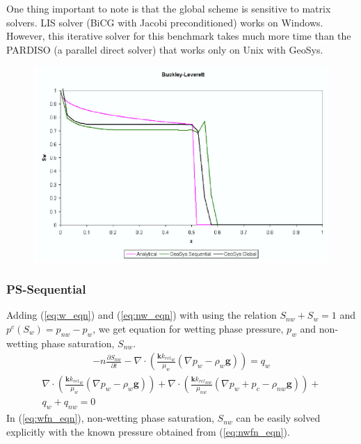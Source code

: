 One thing important to note is that the global scheme is sensitive to matrix solvers. LIS solver (BiCG with Jacobi preconditioned) works on Windows. However, this iterative solver for this benchmark takes much more time than the PARDISO (a parallel direct solver) that works only on Unix with GeoSys.
\begin{figure}[!thb]
\begin{center}
\includegraphics[scale=0.5]{HH/figures/PSGlobal.eps}
\end{center}
\vspace{-8.0cm}
\caption{}
\label{blg:comparison}
\end{figure}
\subsubsection*{\upshape\textbf{PS-Sequential}}
\hspace*{0.25cm}Adding (\ref{eq:w_eqn}) and (\ref{eq:nw_eqn}) with using the relation $S_{nw}+ S_w = 1$ and $p^{c}(S_w) = p_{nw} - p_w$, we get equation for wetting phase pressure, $p_{w}$ and non-wetting phase saturation, $S_{nw}$.
\begin{align}
 - n\frac{{\partial S_{nw}}}{{\partial t }} -
\nabla \cdot \left({\frac{{\mathbf k {k_{rel}}_w }}{{\mu_w }}\left( {\nabla p_w - \rho _w
\mathbf g} \right)} \right) = q_w
\label{eq:wfn_eqn}
\end{align}
\begin{align}
\nabla \cdot \left({\frac{{\mathbf k {k_{rel}}_w }}{{\mu_w }}\left( {\nabla p_w - \rho _w
\mathbf g} \right)} \right) +
\nabla \cdot \left({\frac{{\mathbf k {k_{rel}}_{nw} }}{{\mu_{nw} }}\left( {\nabla {p_w+p_c} - \rho _{nw}\mathbf g} \right)} \right) + \nonumber\\q_w + q_{nw} =0
\label{eq:nwfn_eqn}
\end{align}
In (\ref{eq:wfn_eqn}), non-wetting phase saturation, $S_{nw}$ can
be easily solved explicitly with the known pressure obtained from
(\ref{eq:nwfn_eqn}).

